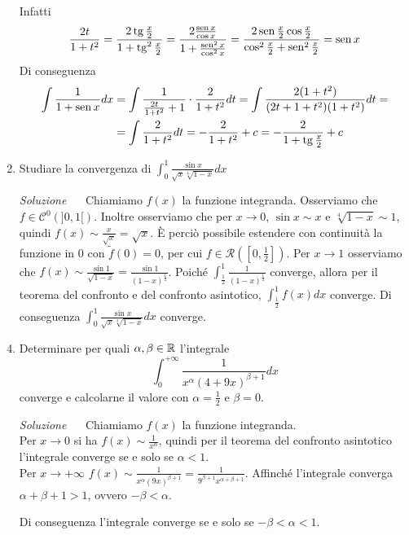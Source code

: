 \documentclass{article}
\begin{document}
\begin{enumerate}[label=\textbf{Esercizio 11.\arabic*.},itemindent=*]
\begin{tasks}
    Infatti
    \[\frac{2t}{1+t^2}=\frac{2\operatorname{tg}\frac{x}{2}}{1+\operatorname{tg}^2\frac{x}{2}}=\frac{2\frac{\operatorname{sen} x}{\cos x}}{1+\frac{\operatorname{sen} ^2x}{\cos^2 x}}=\frac{2\operatorname{sen} \frac{x}{2}\cos \frac{x}{2}}{\cos^2\frac{x}{2}+\operatorname{sen}^2 \frac{x}{2}}=\operatorname{sen} x\]
    Di conseguenza
    \[\begin{aligned}\int\frac{1}{1+\operatorname{sen} x}dx&=\int\frac{1}{\frac{2t}{1+t^2}+1}\cdot \frac{2}{1+t^2}dt=\int \frac{2(1+t^2)}{(2t+1+t^2)(1+t^2)}dt=\\&=\int \frac{2}{1+t^2}dt=-\frac{2}{1+t^2}+c=-\frac{2}{1+\operatorname{tg} \frac{x}{2}}+c\end{aligned}\]
\end{tasks}
\item Studiare la convergenza di $\int_0^1\frac{\sin x}{\sqrt{x}\sqrt[4]{1-x}}dx$
\item[\textit{\large Soluzione~}]~ Chiamiamo $f(x)$ la funzione integranda. Osserviamo che $f\in \mathcal{C}^0(]0,1[)$. Inoltre osserviamo che per $x\to 0$, $\sin x\sim x$ e $\sqrt[4]{1-x}\sim 1$, quindi $f(x)\sim \frac{x}{\sqrt{x}}=\sqrt{x}$. È perciò possibile estendere con continuità la funzione in 0 con $\tilde{f}(0)=0$, per cui $f\in \mathcal{R}\left(\left[0,\frac{1}{2}\right]\right)$. Per $x\to1$ osserviamo che $f(x)\sim\frac{\sin 1}{\sqrt{1-x}}=\frac{\sin 1}{(1-x)^{\frac{1}{4}}}$. Poiché $\int_{\frac{1}{2}}^1\frac{1}{(1-x)^{\frac{1}{4}}}$ converge, allora per il teorema del confronto e del confronto asintotico, $\int_{\frac{1}{2}}^1f(x)dx$ converge. Di conseguenza $\int_0^1\frac{\sin x}{\sqrt{x}\sqrt[4]{1-x}}dx$ converge.
\item Determinare per quali $\alpha, \beta\in \mathbb{R}$ l'integrale
\[\int_0^{+\infty}\frac{1}{x^\alpha(4+9x)^{\beta+1}}dx\]
converge e calcolarne il valore con $\alpha=\frac{1}{2}$ e $\beta=0$. 
\item[\textit{\large Soluzione~}]~ Chiamiamo $f(x)$ la funzione integranda.
\\ Per $x\to 0$ si ha $f(x)\sim \frac{1}{x^\alpha}$, quindi per il teorema del confronto asintotico l'integrale converge se e solo se $\alpha <1$. 
\\ Per $x\to +\infty$ $f(x)\sim\frac{1}{x^\alpha(9x)^{\beta+1}}=\frac{1}{9^{\beta+1}x^{\alpha+\beta+1}}$. Affinché l'integrale converga $\alpha+\beta+1>1$, ovvero $-\beta<\alpha$.

Di conseguenza l'integrale converge se e solo se $-\beta<\alpha<1$.



\end{enumerate}
\end{document}
